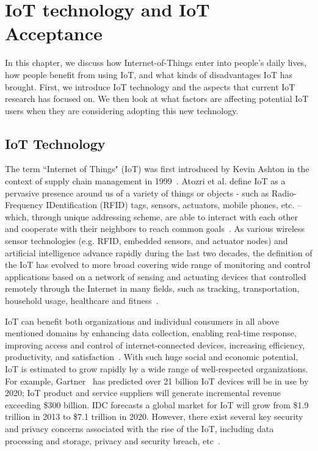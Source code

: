 \chapter{IoT technology and IoT Acceptance}\label{chapter:Relatedwork1}
In this chapter, we discuss how Internet-of-Things enter into people's daily lives, how people benefit from using IoT, and what kinds of disadvantages IoT has brought. First, we introduce IoT technology and the aspects that current IoT research has focused on. We then look at what factors are affecting potential IoT users when they are considering adopting this new technology.

\section{IoT Technology}
The term ``Internet of Things" (IoT) was first introduced by Kevin Ashton in the context of supply chain management in 1999~\cite{ashton2009internet}. Atozri et al. define IoT as a pervasive presence around us of a variety of things or objects - such as Radio-Frequency IDentification (RFID) tags, sensors, actuators, mobile phones, etc. -- which, through unique addressing scheme, are able to interact with each other and cooperate with their neighbors to reach common goals~\cite{atzori2010internet}. As various wireless sensor technologies (e.g. RFID, embedded sensors, and actuator nodes) and artificial intelligence advance rapidly during the last two decades, the definition of the IoT has evolved to more broad covering wide range of monitoring and control applications based on a network of sensing and actuating devices that controlled remotely through the Internet in many fields, such as tracking, transportation, household usage, healthcare and fitness~\cite{li2011smart, solima2016object, kelly2013towards, jia2012rfid, hassanalieragh2015health}.

IoT can benefit both organizations and individual consumers in all above mentioned domains by enhancing data collection, enabling real-time response, improving access and control of internet-connected devices, increasing efficiency, productivity, and satisfaction~\cite{weinberg2015internet, porter2014smart}. With such huge social and economic potential, IoT is estimated to grow rapidly by a wide range of well-respected organizations. For example, Gartner~\cite{eddy2015gartner} has predicted over 21 billion IoT devices will be in use by 2020; IoT product and service suppliers will generate incremental revenue exceeding \$300 billion. IDC forecasts a global market for IoT will grow from \$1.9 trillion in 2013 to \$7.1 trillion in 2020. However, there exist several key security and privacy concerns associated with the rise of the IoT, including data processing and storage, privacy and security breach, etc~\cite{weinberg2015internet, lu2014overview, yu2015handling}.

